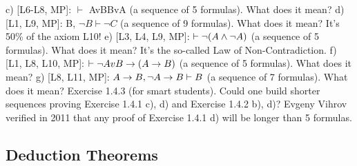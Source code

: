 c) [L6-L8, MP]: \(\vdash\) AvB\IMPLIES BvA (a sequence of 5 formulas). What does it mean?
d) [L1, L9, MP]: B, \(\neg B \vdash \neg C\) (a sequence of 9 formulas). What does it mean? It's 50\% of the axiom L10!
e) [L3, L4, L9, MP]: \(\vdash \neg (A\wedge \neg A)\) (a sequence of 5 formulas). What does it mean? It's the so-called Law of
Non-Contradiction.
f) [L1, L8, L10, MP]: \(\vdash \neg AvB\rightarrow (A\rightarrow B)\) (a sequence of 5 formulas). What does it mean?
g) [L8, L11, MP]: \(A\rightarrow B, \neg A\rightarrow B \vdash B\) (a sequence of 7 formulas). What does it mean?
Exercise 1.4.3 (for smart students). Could one build shorter sequences proving Exercise 1.4.1 c), d) and
Exercise 1.4.2 b), d)? Evgeny Vihrov verified in 2011 that any proof of Exercise 1.4.1 d) will be longer
than 5 formulas.

\subsection{Deduction Theorems}

